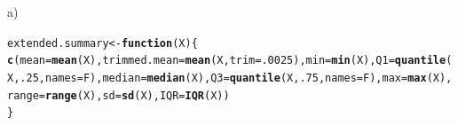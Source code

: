 \documentclass{article}\usepackage[]{graphicx}\usepackage[]{color}
\makeatletter
\newcommand{\hlnum}[1]{\textcolor[rgb]{0.686,0.059,0.569}{#1}}%
\newcommand{\hlstd}[1]{\textcolor[rgb]{0.345,0.345,0.345}{#1}}%
\newcommand{\hlkwa}[1]{\textcolor[rgb]{0.161,0.373,0.58}{\textbf{#1}}}%
\newcommand{\hlkwb}[1]{\textcolor[rgb]{0.69,0.353,0.396}{#1}}%
\newcommand{\hlkwc}[1]{\textcolor[rgb]{0.333,0.667,0.333}{#1}}%
\newcommand{\hlkwd}[1]{\textcolor[rgb]{0.737,0.353,0.396}{\textbf{#1}}}%
\newenvironment{kframe}{%
 \def\at@end@of@kframe{}%
 \ifinner\ifhmode%
  \def\at@end@of@kframe{\end{minipage}}%
  \begin{minipage}{\columnwidth}%
 \fi\fi%
 \def\FrameCommand##1{\hskip\@totalleftmargin \hskip-\fboxsep
 \colorbox{shadecolor}{##1}\hskip-\fboxsep
     \hskip-\linewidth \hskip-\@totalleftmargin \hskip\columnwidth}%
 \MakeFramed {\advance\hsize-\width
   \@totalleftmargin\z@ \linewidth\hsize
   \@setminipage}}%
 {\par\unskip\endMakeFramed%
 \at@end@of@kframe}
\newenvironment{knitrout}{}{} %
\makeatother
\begin{document}
\begin{description}


\item{a)}

\begin{knitrout}
\color{fgcolor}\begin{kframe}
\begin{alltt}
\hlstd{extended.summary} \hlkwb{<-} \hlkwa{function}\hlstd{(}\hlkwc{X}\hlstd{) \{}
    \hlkwd{c}\hlstd{(}\hlkwc{mean} \hlstd{=} \hlkwd{mean}\hlstd{(X),} \hlkwc{trimmed.mean} \hlstd{=} \hlkwd{mean}\hlstd{(X,} \hlkwc{trim}\hlstd{=}\hlnum{.0025}\hlstd{),} \hlkwc{min} \hlstd{=} \hlkwd{min}\hlstd{(X),} \hlkwc{Q1} \hlstd{=} \hlkwd{quantile}\hlstd{(X,} \hlnum{.25}\hlstd{,} \hlkwc{names}\hlstd{=F),} \hlkwc{median} \hlstd{=} \hlkwd{median}\hlstd{(X),} \hlkwc{Q3} \hlstd{=} \hlkwd{quantile}\hlstd{(X,} \hlnum{.75}\hlstd{,} \hlkwc{names}\hlstd{=F),} \hlkwc{max} \hlstd{=} \hlkwd{max}\hlstd{(X),} \hlkwc{range} \hlstd{=} \hlkwd{range}\hlstd{(X),} \hlkwc{sd} \hlstd{=} \hlkwd{sd}\hlstd{(X),} \hlkwc{IQR} \hlstd{=} \hlkwd{IQR}\hlstd{(X))}
\hlstd{\}}


\end{alltt}
\end{kframe}
\end{knitrout}
\end{description}
\end{document}
